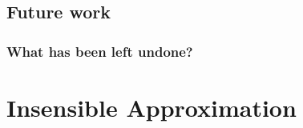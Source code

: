 \documentclass[12pt,a4paper,twoside,openright]{book}
\begin{document}
\section{Future work}
\label{sec:future-work}


\subsection{What has been left undone?}
\label{ssec:what-has-been-left-undone}




\printbibliography[heading=bibintoc]

\appendix
\chapter{Insensible Approximation}

\backmatter
\end{document}
